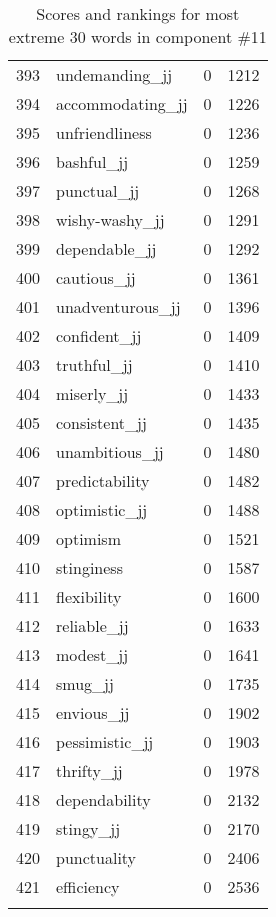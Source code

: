 \begin{longtable}[!htbp]{| rlr@{.}l |}
    393 & undemanding\_jj & 0 & 1212 \\
    394 & accommodating\_jj & 0 & 1226 \\
    395 & unfriendliness & 0 & 1236 \\
    396 & bashful\_jj & 0 & 1259 \\
    397 & punctual\_jj & 0 & 1268 \\
    398 & wishy-washy\_jj & 0 & 1291 \\
    399 & dependable\_jj & 0 & 1292 \\
    400 & cautious\_jj & 0 & 1361 \\
    401 & unadventurous\_jj & 0 & 1396 \\
    402 & confident\_jj & 0 & 1409 \\
    403 & truthful\_jj & 0 & 1410 \\
    404 & miserly\_jj & 0 & 1433 \\
    405 & consistent\_jj & 0 & 1435 \\
    406 & unambitious\_jj & 0 & 1480 \\
    407 & predictability & 0 & 1482 \\
    408 & optimistic\_jj & 0 & 1488 \\
    409 & optimism & 0 & 1521 \\
    410 & stinginess & 0 & 1587 \\
    411 & flexibility & 0 & 1600 \\
    412 & reliable\_jj & 0 & 1633 \\
    413 & modest\_jj & 0 & 1641 \\
    414 & smug\_jj & 0 & 1735 \\
    415 & envious\_jj & 0 & 1902 \\
    416 & pessimistic\_jj & 0 & 1903 \\
    417 & thrifty\_jj & 0 & 1978 \\
    418 & dependability & 0 & 2132 \\
    419 & stingy\_jj & 0 & 2170 \\
    420 & punctuality & 0 & 2406 \\
    421 & efficiency & 0 & 2536 \\
    \hline
    \caption{Scores and rankings for most extreme 30 words in component \#11} \\
\end{longtable}
